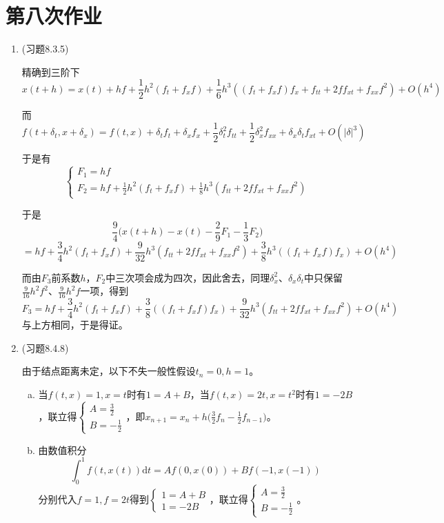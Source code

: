 \documentclass[a4paper,UTF8,fontset=windows]{ctexart}
\begin{document}
\section{第八次作业}
\begin{enumerate}
    \item (习题8.3.5)
    
    精确到三阶下
    $$x(t+h)=x(t)+hf+\frac{1}{2}h^2(f_t+f_xf)+\frac{1}{6}h^3((f_t+f_xf)f_x+f_{tt}+2ff_{xt}+f_{xx}f^2)+O(h^4)$$
    
    而
    $$f(t+\delta_t,x+\delta_x)=f(t,x)+\delta_tf_t+\delta_xf_x+\frac{1}{2}\delta_{t}^2f_{tt}+\frac{1}{2}\delta_x^2f_{xx}+\delta_x\delta_tf_{xt}+O(|\delta|^3)$$
    
    于是有
    $$\begin{cases}F_1=hf\\F_2=hf+\frac{1}{2}h^2(f_t+f_xf)+\frac{1}{8}h^3(f_{tt}+2ff_{xt}+f_{xx}f^2)\end{cases}$$
    
    于是
    $$\frac{9}{4}\bigg(x(t+h)-x(t)-\frac{2}{9}F_1-\frac{1}{3}F_2\bigg)$$
    $$=hf+\frac{3}{4}h^2(f_t+f_xf)+\frac{9}{32}h^3(f_{tt}+2ff_{xt}+f_{xx}f^2)+\frac{3}{8}h^3((f_t+f_xf)f_x)+O(h^4)$$
    
    而由$F_3$前系数$h$，$F_2$中三次项会成为四次，因此舍去，同理$\delta_x^2$、$\delta_x\delta_t$中只保留$\frac{9}{16}h^2f^2$、$\frac{9}{16}h^2f$一项，得到
    $$F_3=hf+\frac{3}{4}h^2(f_t+f_xf)+\frac{3}{8}((f_t+f_xf)f_x)+\frac{9}{32}h^3(f_{tt}+2ff_{xt}+f_{xx}f^2)+O(h^4)$$
    与上方相同，于是得证。
    
    \item (习题8.4.8)
    
    由于结点距离未定，以下不失一般性假设$t_n=0,h=1$。
    \begin{enumerate}[a.]
    \item
    当$f(t,x)=1,x=t$时有$1=A+B$，当$f(t,x)=2t,x=t^2$时有$1=-2B$，联立得$\begin{cases}A=\frac{3}{2}\\B=-\frac{1}{2}\end{cases}$，即$x_{n+1}=x_n+h\big(\frac{3}{2}f_n-\frac{1}{2}f_{n-1}\big)$。
    
    \item
    由数值积分
    $$\int_0^1f(t,x(t))\mathrm{d}t=Af(0,x(0))+Bf(-1,x(-1))$$
    分别代入$f=1,f=2t$得到$\begin{cases}1=A+B\\1=-2B\end{cases}$，联立得$\begin{cases}A=\frac{3}{2}\\B=-\frac{1}{2}\end{cases}$。
    

\end{enumerate}
\end{enumerate}
\end{document}
